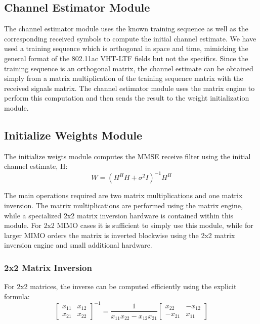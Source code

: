 \documentclass[journal]{IEEEtran}
\begin{document}
\subsection{Channel Estimator Module}

The channel estimator module uses the known training sequence as well as the corresponding received symbols to compute the initial channel estimate. We have used a training sequence which is orthogonal in space and time, mimicking the general format of the 802.11ac VHT-LTF fields but not the specifics. Since the training sequence is an orthogonal matrix, the channel estimate can be obtained simply from a matrix multiplication of the training sequence matrix with the received signals matrix. The channel estimator module uses the matrix engine to perform this computation and then sends the result to the weight initialization module.

\subsection{Initialize Weights Module}

The initialize weigts module computes the MMSE receive filter using the initial channel estimate, H:
\[W = (H^H H + \sigma^2I)^{-1} H^H \]

The main operations required are two matrix multiplications and one matrix inversion. The matrix multiplications are performed using the matrix engine, while a specialized 2x2 matrix inversion hardware is contained within this module. For 2x2 MIMO cases it is sufficient to simply use this module, while for larger MIMO orders the matrix is inverted blockwise using the 2x2 matrix inversion engine and small additional hardware.

\subsubsection{2x2 Matrix Inversion}

For 2x2 matrices, the inverse can be computed efficiently using the explicit formula:
\[\left[ \begin{array}{cc} x_{11} & x_{12} \\ x_{21} & x_{22} \end{array}\right]^{-1} = \frac{1}{x_{11}x_{22}-x_{12}x_{21}}\left[ \begin{array}{cc} x_{22} & -x_{12} \\ -x_{21} & x_{11} \end{array}\right]\]
\end{document}

